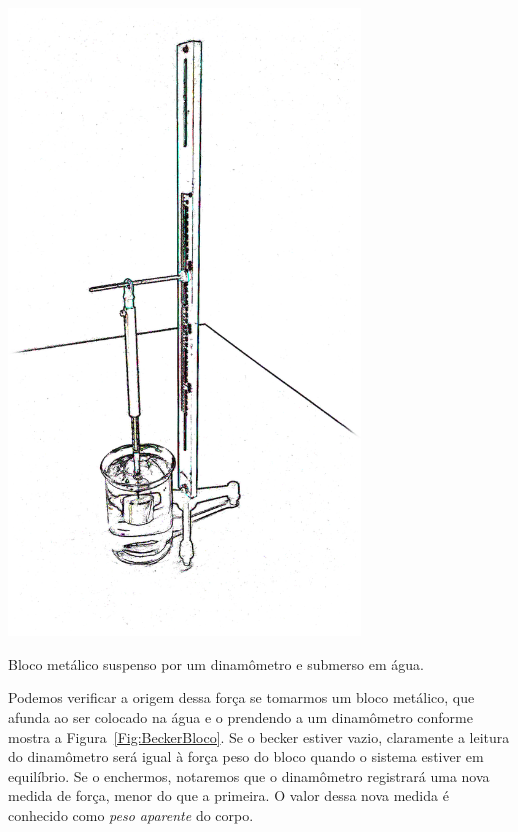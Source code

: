 \begin{marginfigure}
\centering
\includegraphics[width=0.7\textwidth]{Ilustrations/Empuxo.png}
\caption{Bloco metálico suspenso por um dinamômetro e submerso em água.}
\label{Fig:BeckerBloco}
\end{marginfigure}

Podemos verificar a origem dessa força se tomarmos um bloco metálico, que afunda ao ser colocado na água e o prendendo a um dinamômetro conforme mostra a Figura~\ref{Fig:BeckerBloco}. Se o becker estiver vazio, claramente a leitura do dinamômetro será igual à força peso do bloco quando o sistema estiver em equilíbrio. Se o enchermos, notaremos que o dinamômetro registrará uma nova medida de força, menor do que a primeira. O valor dessa nova medida é conhecido como \emph{peso aparente} do corpo.

